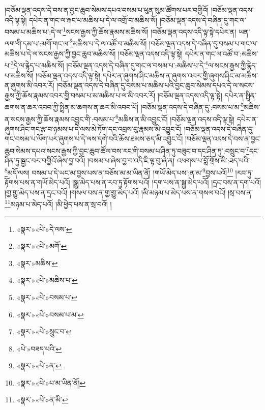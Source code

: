 །བཅོམ་ལྡན་འདས་དེ་བས་ན་བྱང་ཆུབ་སེམས་དཔའ་བསམ་པ་ཕུན་སུམ་ཚོགས་པར་བགྱིའོ། །བཅོམ་ལྡན་འདས་འདི་ལྟ་སྟེ། དཔེར་ན་གང་ལ་རྐང་པ་མཆིས་པ་དེ་ལ་འགྲོ་བ་མཆིས་སོ། །བཅོམ་ལྡན་འདས་དེ་བཞིན་དུ་གང་ལ་བསམ་པ་མཆིས་པ་:དེ་ལ་\footnote{«སྣར་»«པེ་»དེ་ལས་}སངས་རྒྱས་ཀྱི་ཆོས་རྣམས་མཆིས་སོ། །བཅོམ་ལྡན་འདས་འདི་ལྟ་སྟེ་དཔེར་ན། ཡན་ལག་གི་དམ་པ་:མགོ་གང་ལ་\footnote{«སྣར་»«པེ་»མགོ་}མཆིས་པ་དེ་ལ་འཚོ་བ་མཆིས་སོ། །བཅོམ་ལྡན་འདས་དེ་བཞིན་དུ་བསམ་པ་གང་ལ་མཆིས་པ་དེ་ལ་སངས་རྒྱས་ཀྱི་བྱང་ཆུབ་མཆིས་སོ། །བཅོམ་ལྡན་འདས་འདི་ལྟ་སྟེ། དཔེར་ན་གང་ལ་འཚོ་བ་:མཆིས་པ་\footnote{«སྣར་»མཆིས་}དེ་ལ་རྙེད་པ་མཆིས་སོ། །བཅོམ་ལྡན་འདས་དེ་བཞིན་དུ་གང་ལ་བསམ་པ་:མཆིས་པ་དེ་\footnote{«སྣར་»«པེ་»མཆིས་པ་}ལ་སངས་རྒྱས་ཀྱི་རྙེད་པ་མཆིས་སོ། །བཅོམ་ལྡན་འདས་འདི་ལྟ་སྟེ། དཔེར་ན་ཞུགས་ཤིང་མཆིས་ན་ཞུགས་འབར་གྱི་ཞུགས་ཤིང་མ་མཆིས་ན་ཞུགས་མི་འབར་རོ། །བཅོམ་ལྡན་འདས་དེ་བཞིན་དུ་བསམ་པ་མཆིས་པའི་བྱང་ཆུབ་སེམས་དཔའ་དེ་ལ་སངས་རྒྱས་ཀྱི་ཆོས་རྣམས་འབར་གྱི་བསམ་པ་མ་མཆིས་པ་ལ་མི་འབར་རོ། །བཅོམ་ལྡན་འདས་འདི་ལྟ་སྟེ། དཔེར་ན་སྤྲིན་ཆགས་ན་ཆར་འབབ་ཀྱི་སྤྲིན་མ་ཆགས་ན་ཆར་མི་འབབ་པོ། །བཅོམ་ལྡན་འདས་དེ་བཞིན་དུ་:བསམ་པ་མ་\footnote{«སྣར་»«པེ་»བསམ་པ་}མཆིས་ན་སངས་རྒྱས་ཀྱི་ཆོས་རྣམས་འབྱུང་གི་:བསམ་པ་\footnote{«སྣར་»«པེ་»བསམ་པ་མ་}མཆིས་ན་མི་འབྱུང་ངོ། །བཅོམ་ལྡན་འདས་འདི་ལྟ་སྟེ། དཔེར་ན་ཞུགས་ཤིང་གང་རྩ་བ་ཉམས་པ་དེ་ལས་མེ་ཏོག་དང་འབྲས་བུ་རྣམས་མི་འབྱུང་ངོ། །བཅོམ་ལྡན་འདས་དེ་བཞིན་དུ་གང་བསམ་པ་ལོག་པར་ཞུགས་པ་དེ་ལས་དགེ་བའི་ཆོས་ཐམས་ཅད་མི་འབྱུང་ངོ། །བཅོམ་ལྡན་འདས་དེ་བས་ན་བྱང་ཆུབ་སེམས་དཔའ་སངས་རྒྱས་ཀྱི་བྱང་ཆུབ་ཚོལ་བས་རང་གི་བསམ་པ་ཤིན་ཏུ་བཟུང་བ་དང་ཤིན་ཏུ་:བསྲུང་བ་\footnote{«སྣར་»«པེ་»སྲུང་བ་}དང་ཤིན་ཏུ་སྦྱང་བར་བགྱིའོ་ཞེས་བྱ་བའོ། །བསམ་པ་ཞེས་བྱ་བ་འདི་ཇི་ལྟ་བུ་ཞེ་ན། འཕགས་པ་བློ་གྲོས་མི་:ཟད་པའི་\footnote{«པེ་»བཟད་པའི་}མདོ་ལས། བསམ་པ་དེ་ཡང་མ་བྱས་པས་ན་བཅོས་མ་མ་ཡིན་ནོ། །གཡོ་མེད་པས་:ན་མ་\footnote{«སྣར་»«པེ་»ན་}བྱས་པའོ།\footnote{«སྣར་»«པེ་»པ་མ་ཡིན་ནོ།} །རབ་ཏུ་རྟོགས་པས་ན་གཡོ་མེད་པའོ། །སྒྱུ་མེད་པས་ན་རབ་ཏུ་རྟོགས་པའོ། །དག་པས་ན་སྒྱུ་མེད་པའོ། །དྲང་བས་ན་དག་པའོ། །གྱ་གྱུ་མེད་པས་ན་དྲང་བའོ། །གསལ་བས་ན་གྱ་གྱུ་མེད་པའོ། །མི་མཉམ་པ་མེད་པས་ན་གསལ་བའོ། །སྲ་བས་ན་\footnote{«སྣར་»«པེ་»ན་མི་}མཉམ་པ་མེད་པའོ། །མི་ཕྱེད་པས་ན་སྲ་བའོ། །
